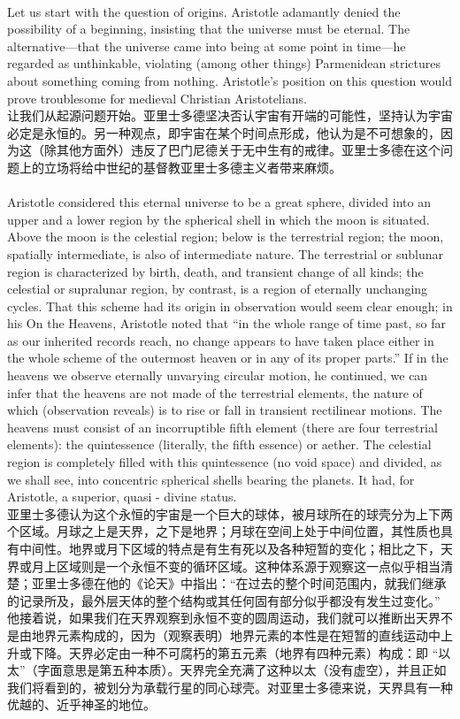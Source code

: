 \documentclass{article}
\begin{document}
\\
Let us start with the question of origins. Aristotle adamantly denied the possibility of a beginning, insisting that the universe must be eternal. The alternative—that the universe came into being at some point in time—he regarded as unthinkable, violating (among other things) Parmenidean strictures about something coming from nothing. Aristotle’s position on this question would prove troublesome for medieval Christian Aristotelians.\\
让我们从起源问题开始。亚里士多德坚决否认宇宙有开端的可能性，坚持认为宇宙必定是永恒的。另一种观点，即宇宙在某个时间点形成，他认为是不可想象的，因为这（除其他方面外）违反了巴门尼德关于无中生有的戒律。亚里士多德在这个问题上的立场将给中世纪的基督教亚里士多德主义者带来麻烦。\\

\\
Aristotle considered this eternal universe to be a great sphere, divided into an upper and a lower region by the spherical shell in which the moon is situated. Above the moon is the celestial region; below is the terrestrial region; the moon, spatially intermediate, is also of intermediate nature. The terrestrial or sublunar region is characterized by birth, death, and transient change of all kinds; the celestial or supralunar region, by contrast, is a region of eternally unchanging cycles. That this scheme had its origin in observation would seem clear enough; in his On the Heavens, Aristotle noted that “in the whole range of time past, so far as our inherited records reach, no change appears to have taken place either in the whole scheme of the outermost heaven or in any of its proper parts.” If in the heavens we observe eternally unvarying circular motion, he continued, we can infer that the heavens are not made of the terrestrial elements, the nature of which (observation reveals) is to rise or fall in transient rectilinear motions. The heavens must consist of an incorruptible fifth element (there are four terrestrial elements): the quintessence (literally, the fifth essence) or aether. The celestial region is completely filled with this quintessence (no void space) and divided, as we shall see, into concentric spherical shells bearing the planets. It had, for Aristotle, a superior, quasi - divine status.\\
亚里士多德认为这个永恒的宇宙是一个巨大的球体，被月球所在的球壳分为上下两个区域。月球之上是天界，之下是地界；月球在空间上处于中间位置，其性质也具有中间性。地界或月下区域的特点是有生有死以及各种短暂的变化；相比之下，天界或月上区域则是一个永恒不变的循环区域。这种体系源于观察这一点似乎相当清楚；亚里士多德在他的《论天》中指出：“在过去的整个时间范围内，就我们继承的记录所及，最外层天体的整个结构或其任何固有部分似乎都没有发生过变化。” 他接着说，如果我们在天界观察到永恒不变的圆周运动，我们就可以推断出天界不是由地界元素构成的，因为（观察表明）地界元素的本性是在短暂的直线运动中上升或下降。天界必定由一种不可腐朽的第五元素（地界有四种元素）构成：即 “以太”（字面意思是第五种本质）。天界完全充满了这种以太（没有虚空），并且正如我们将看到的，被划分为承载行星的同心球壳。对亚里士多德来说，天界具有一种优越的、近乎神圣的地位。\\
\end{document}

